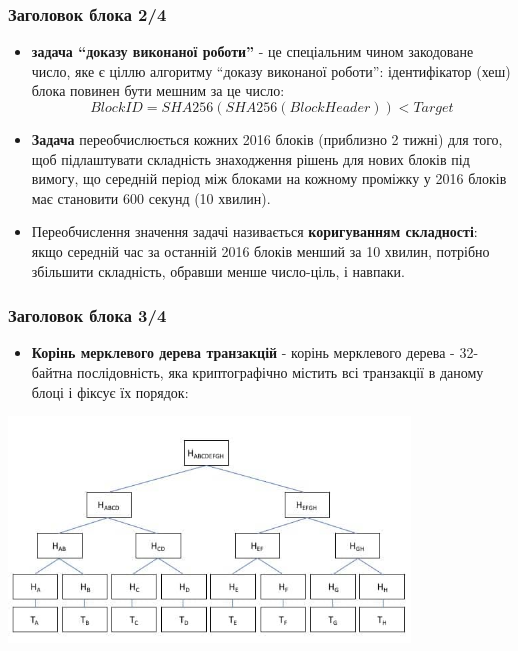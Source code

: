 \documentclass{beamer}
\begin{document}
\begin{frame}
  \frametitle{Заголовок блока 2/4}
  \begin{small}
    \begin{itemize}
    \item \textbf{задача ``доказу виконаної роботи''} - це спеціальним чином
      закодоване число, яке є ціллю алгоритму ``доказу виконаної роботи'':
      ідентифікатор (хеш) блока повинен бути мешним за це число:
      $$ BlockID = SHA256(SHA256(BlockHeader)) < Target$$
    \item \textbf{Задача} переобчислюється кожних 2016 блоків (приблизно 2 тижні)
      для того, щоб підлаштувати складність знаходження рішень для нових блоків
      під вимогу, що середній період між блоками на кожному проміжку у 2016 блоків
      має становити 600 секунд (10 хвилин).
    \item Переобчислення значення задачі називається \textbf{коригуванням
        складності}: якщо середній час за останній 2016 блоків менший за 10
      хвилин, потрібно збільшити складність, обравши менше число-ціль, і навпаки.
    \end{itemize}
  \end{small}
\end{frame}

\begin{frame}
  \frametitle{Заголовок блока 3/4}
  \begin{itemize}
  \item \textbf{Корінь мерклевого дерева транзакцій} - корінь мерклевого дерева
    - 32-байтна послідовність, яка криптографічно містить всі транзакції в
    даному блоці і фіксує їх порядок:
  \end{itemize}
  \begin{center}
    \includegraphics[width=0.8\textwidth]{merkletree}
  \end{center}
\end{frame}
\end{document}

